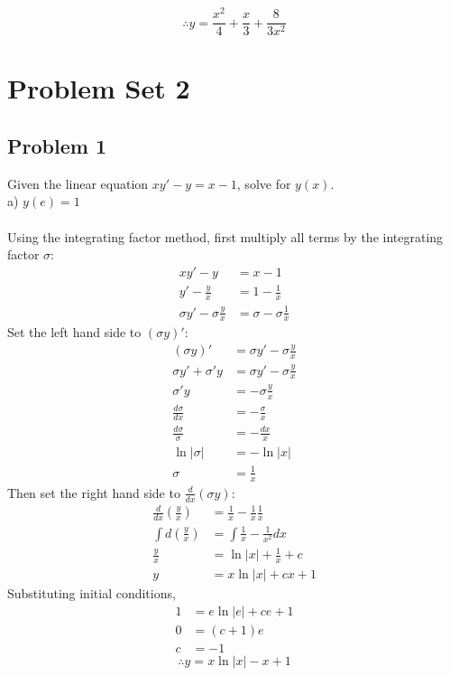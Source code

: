 \documentclass[titlepage]{article}
\begin{document}
$$\therefore y = \frac{x^2}{4} + \frac{x}{3} + \frac{8}{3x^2}$$

\section{Problem Set 2}
\subsection{Problem 1}
Given the linear equation $xy' - y = x - 1$, solve for $y(x)$.
\\ a) $y(e) = 1$
\\ \\ Using the integrating factor method, first multiply all terms by the integrating factor $\sigma$:
\begin{align*}
xy' - y &= x - 1
\\ y' - \frac{y}{x} &= 1 - \frac{1}{x}
\\ \sigma y' - \sigma \frac{y}{x} &= \sigma - \sigma \frac{1}{x}
\end{align*}
Set the left hand side to $(\sigma y)'$:
\begin{align*}
(\sigma y)' &= \sigma y' - \sigma \frac{y}{x}
\\ \sigma y' + \sigma'y &= \sigma y' - \sigma \frac{y}{x}
\\ \sigma'y &= - \sigma \frac{y}{x}
\\ \frac{d\sigma}{dx} &= - \frac{\sigma}{x}
\\ \frac{d\sigma}{\sigma} &= - \frac{dx}{x}
\\ \ln \left| \sigma \right| &= - \ln \left| x \right|
\\ \sigma &= \frac{1}{x}
\end{align*}
Then set the right hand side to $\frac{d}{dx} (\sigma y)$:
\begin{align*}
\frac{d}{dx} (\frac{y}{x}) &= \frac{1}{x} - \frac{1}{x}\frac{1}{x}
\\ \int d (\frac{y}{x}) &= \int \frac{1}{x} - \frac{1}{x^2} dx
\\ \frac{y}{x} &= \ln \left| x \right| + \frac{1}{x} + c
\\ y &= x\ln \left| x \right| + cx + 1
\end{align*}
Substituting initial conditions,
\begin{align*}
1 &= e\ln \left| e \right| + ce + 1
\\ 0 &= (c + 1)e
\\ c &= - 1
\end{align*}
$$ \therefore y = x\ln \left| x \right| - x + 1 $$
\end{document}
